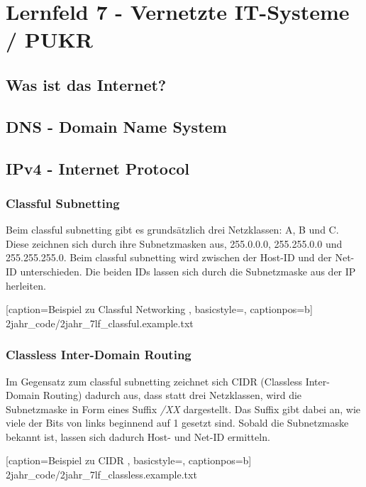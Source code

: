\section{Lernfeld 7 - Vernetzte IT-Systeme / PUKR} %


\subsection{Was ist das Internet?}

\subsection{DNS - Domain Name System}

\subsection{IPv4 - Internet Protocol}

\subsubsection{Classful Subnetting}

Beim classful subnetting gibt es grundsätzlich drei Netzklassen: A, B und C. Diese zeichnen sich durch ihre Subnetzmasken aus, 255.0.0.0, 255.255.0.0 und 255.255.255.0. Beim classful subnetting wird zwischen der Host-ID und der Net-ID unterschieden. Die beiden IDs lassen sich durch die Subnetzmaske aus der IP herleiten.


	[caption={Beispiel zu Classful Networking}
	\label{lst:7lf_classful.example},
	basicstyle=\small,
	captionpos=b]
	{2jahr_code/2jahr_7lf_classful.example.txt}

\subsubsection{Classless Inter-Domain Routing}

Im Gegensatz zum classful subnetting zeichnet sich CIDR (Classless Inter-Domain Routing) dadurch aus, dass statt drei Netzklassen, wird die Subnetzmaske in Form eines Suffix {\it /XX} dargestellt. Das Suffix gibt dabei an, wie viele der Bits von links beginnend auf 1 gesetzt sind. Sobald die Subnetzmaske bekannt ist, lassen sich dadurch Host- und Net-ID ermitteln.


	[caption={Beispiel zu CIDR}
	\label{lst:7lf_classless.example},
	basicstyle=\small,
	captionpos=b]
	{2jahr_code/2jahr_7lf_classless.example.txt}
	